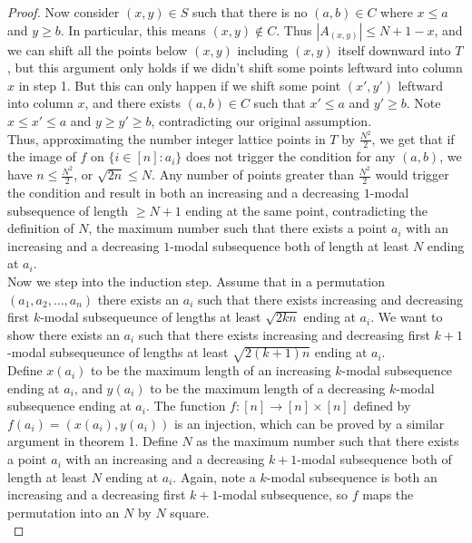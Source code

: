 \documentclass{article}
\begin{document}
\begin{proof}
Now consider $(x,y) \in S$ such that there is no $(a,b) \in C$ where $x \leq a$ and $y \geq b$. In particular, this means $(x,y) \not\in C$. Thus $|A_{(x,y)}| \leq N+1-x$, and we can shift all the points below $(x,y)$ including $(x,y)$ itself downward into $T$, but this argument only holds if we didn't shift some points leftward into column $x$ in step 1. But this can only happen if we shift some point $(x',y')$ leftward into column $x$, and there exists $(a,b) \in C$ such that $x' \leq a$ and $y' \geq b$. Note $x \leq x' \leq a$ and $y \geq y' \geq b$, contradicting our original assumption. \\

Thus, approximating the number integer lattice points in $T$ by $\frac{N^2}{2}$, we get that if the image of $f$ on $\{i \in [n] : a_i\}$ does not trigger the condition for any $(a,b)$, we have $n \leq \frac{N^2}{2}$, or $\sqrt{2n} \leq N$. Any number of points greater than $\frac{N^2}{2}$ would trigger the condition and result in both an increasing and a decreasing $1$-modal subsequence of length $\geq N+1$ ending at the same point, contradicting the definition of $N$, the maximum number such that there exists a point $a_i$ with an increasing and a decreasing $1$-modal subsequence both of length at least $N$ ending at $a_i$.  \\

Now we step into the induction step. Assume that in a permutation $(a_1, a_2, \ldots, a_n)$ there exists an $a_i$ such that there exists increasing and decreasing first $k$-modal subsequeunce of lengths at least $\sqrt{2kn}$ ending at $a_i$. We want to show there exists an $a_i$ such that there exists increasing and decreasing first $k+1$-modal subsequeunce of lengths at least $\sqrt{2(k+1)n}$ ending at $a_i$. \\

Define $x(a_i)$ to be the maximum length of an increasing $k$-modal subsequence ending at $a_i$, and $y(a_i)$ to be the maximum length of a decreasing $k$-modal subsequence ending at $a_i$. The function $f : [n] \rightarrow [n] \times [n]$ defined by $f(a_i) = (x(a_i), y(a_i))$ is an injection, which can be proved by a similar argument in theorem 1. Define $N$ as the maximum number such that there exists a point $a_i$ with an increasing and a decreasing $k+1$-modal subsequence both of length at least $N$ ending at $a_i$. Again, note a $k$-modal subsequence is both an increasing and a decreasing first $k+1$-modal subsequence, so $f$ maps the permutation into an $N$ by $N$ square. \\


\end{proof}
\end{document}
